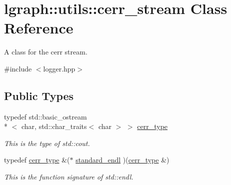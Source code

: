 \hypertarget{classlgraph_1_1utils_1_1cerr__stream}{\section{lgraph\-:\-:utils\-:\-:cerr\-\_\-stream Class Reference}
\label{classlgraph_1_1utils_1_1cerr__stream}
}


A class for the cerr stream.  




{\ttfamily \#include $<$logger.\-hpp$>$}

\subsection*{Public Types}
\begin{DoxyCompactItemize}
\item 
\hypertarget{classlgraph_1_1utils_1_1cerr__stream_a60b0847503d146249b71e70473740f57}{typedef std\-::basic\-\_\-ostream\\*
$<$ char, std\-::char\-\_\-traits$<$ char $>$ $>$ \hyperlink{classlgraph_1_1utils_1_1cerr__stream_a60b0847503d146249b71e70473740f57}{cerr\-\_\-type}}\label{classlgraph_1_1utils_1_1cerr__stream_a60b0847503d146249b71e70473740f57}

\begin{DoxyCompactList}\small\item\em This is the type of std\-::cout. \end{DoxyCompactList}\item 
\hypertarget{classlgraph_1_1utils_1_1cerr__stream_a3eda0896c5bf29dfcdee1640314baa36}{typedef \hyperlink{classlgraph_1_1utils_1_1cerr__stream_a60b0847503d146249b71e70473740f57}{cerr\-\_\-type} \&($\ast$ \hyperlink{classlgraph_1_1utils_1_1cerr__stream_a3eda0896c5bf29dfcdee1640314baa36}{standard\-\_\-endl} )(\hyperlink{classlgraph_1_1utils_1_1cerr__stream_a60b0847503d146249b71e70473740f57}{cerr\-\_\-type} \&)}\label{classlgraph_1_1utils_1_1cerr__stream_a3eda0896c5bf29dfcdee1640314baa36}

\begin{DoxyCompactList}\small\item\em This is the function signature of std\-::endl. \end{DoxyCompactList}\end{DoxyCompactItemize}
